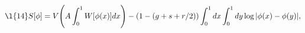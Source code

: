 \begin{equation}\l{14}
S[\phi ] = V{\Biggr (}A \int _{0}^{1} W[\phi (x)] dx{\Biggl )}
- (1-(g +s +r/2))\int_{0}^{1} dx \int_0^{1} dy \log|\phi(x)- \phi(y)|,
\end{equation}

